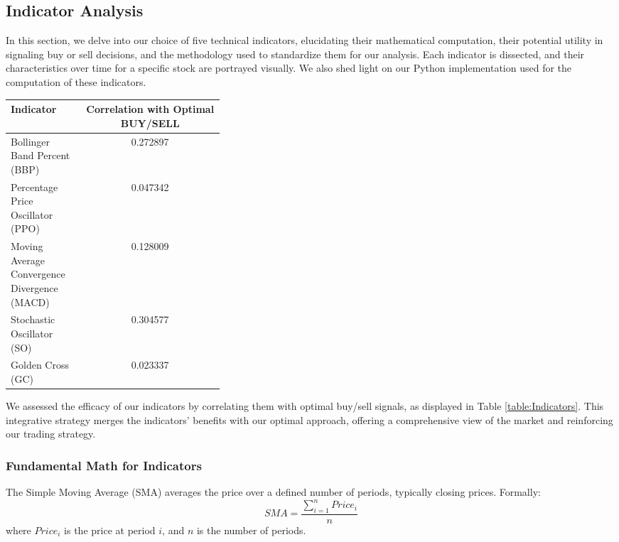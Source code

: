 \documentclass[
	letterpaper, %
]{jdf}
\begin{document}
\subsection{Indicator Analysis}

In this section, we delve into our choice of five technical indicators, elucidating their mathematical computation, their potential utility in signaling buy or sell decisions, and the methodology used to standardize them for our analysis. Each indicator is dissected, and their characteristics over time for a specific stock are portrayed visually. We also shed light on our Python implementation used for the computation of these indicators.

\begin{jdftable}
\label{table:Indicators}
\small %
\begin{tabular}{@{} L{0.35\linewidth} S}
		\textbf{Indicator} & \textbf{Correlation with Optimal BUY/SELL} \\
		\toprule[0.5pt]
		Bollinger Band Percent (BBP) & 0.272897 \\
		\midrule
		Percentage Price Oscillator (PPO) & 0.047342 \\
		\midrule
		Moving Average Convergence Divergence (MACD) & 0.128009 \\
		\midrule
		Stochastic Oscillator (SO) & 0.304577 \\
		\midrule
		Golden Cross (GC) & 0.023337 \\
\end{tabular}
\end{jdftable}

We assessed the efficacy of our indicators by correlating them with optimal buy/sell signals, as displayed in Table \ref{table:Indicators}. This integrative strategy merges the indicators' benefits with our optimal approach, offering a comprehensive view of the market and reinforcing our trading strategy.

\subsubsection{Fundamental Math for Indicators}

The Simple Moving Average (SMA) averages the price over a defined number of periods, typically closing prices. Formally:
{\small
\[
SMA = \frac{\sum_{i=1}^{n}Price_{i}}{n}
\]
}
where $Price_{i}$ is the price at period $i$, and $n$ is the number of periods.
\end{document}

